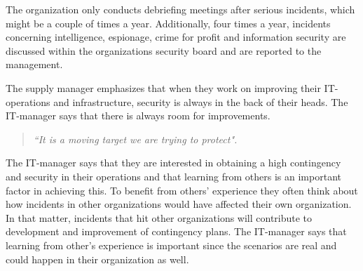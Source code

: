 The organization only conducts debriefing meetings after serious incidents, which might be a couple of times a year. Additionally, four times a year, incidents concerning intelligence, espionage, crime for profit and information security are discussed within the organizations security board and are reported to the management. 

The supply manager emphasizes that when they work on improving their IT-operations and infrastructure, security is always in the back of their heads. The IT-manager says that there is always room for improvements. 
\begin{quote}
\textit{``It is a moving target we are trying to protect".}
\end{quote}

The IT-manager says that they are interested in obtaining a high contingency and security in their operations and that learning from others is an important factor in achieving this. To benefit from others' experience they often think about how incidents in other organizations would have affected their own organization. In that matter, incidents that hit other organizations will contribute to development and improvement of contingency plans. The IT-manager says that learning from other's experience is important since the scenarios are real and could happen in their organization as well.